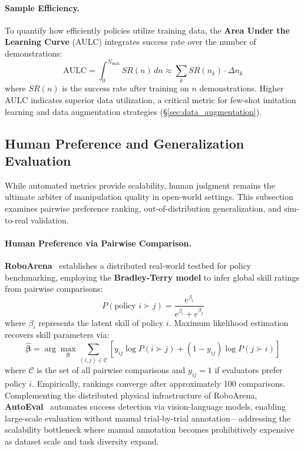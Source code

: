 \documentclass[acmsmall,screen,review,anonymous]{acmart}
\begin{document}
\paragraph{Sample Efficiency.}
To quantify how efficiently policies utilize training data, the \textbf{Area Under the Learning Curve} (AULC) integrates success rate over the number of demonstrations:
\begin{equation}
  \text{AULC} = \int_0^{N_{\max}} SR(n)\, dn \approx \sum_{k} SR(n_k) \cdot \Delta n_k
\end{equation}
where $SR(n)$ is the success rate after training on $n$ demonstrations. Higher AULC indicates superior data utilization, a critical metric for few-shot imitation learning and data augmentation strategies (\S\ref{sec:data_augmentation}).

\subsection{Human Preference and Generalization Evaluation}\label{sec:eval_human_generalization}

While automated metrics provide scalability, human judgment remains the ultimate arbiter of manipulation quality in open-world settings. This subsection examines pairwise preference ranking, out-of-distribution generalization, and sim-to-real validation.

\paragraph{Human Preference via Pairwise Comparison.}
\textbf{RoboArena}~\cite{atreya2025roboarena} establishes a distributed real-world testbed for policy benchmarking, employing the \textbf{Bradley-Terry model} to infer global skill ratings from pairwise comparisons:
\begin{equation}
  P(\text{policy } i \succ j) = \frac{e^{\beta_i}}{e^{\beta_i} + e^{\beta_j}}
\end{equation}
where $\beta_i$ represents the latent skill of policy $i$. Maximum likelihood estimation recovers skill parameters via:
\begin{equation}
  \hat{\boldsymbol{\beta}} = \arg\max_{\boldsymbol{\beta}} \sum_{(i,j)\in\mathcal{C}} \left[y_{ij}\log P(i \succ j) + (1-y_{ij})\log P(j \succ i)\right]
\end{equation}
where $\mathcal{C}$ is the set of all pairwise comparisons and $y_{ij}=1$ if evaluators prefer policy $i$. Empirically, rankings converge after approximately 100 comparisons. Complementing the distributed physical infrastructure of RoboArena, \textbf{AutoEval}~\cite{zhou2025autoeval} automates success detection via vision-language models, enabling large-scale evaluation without manual trial-by-trial annotation---addressing the scalability bottleneck where manual annotation becomes prohibitively expensive as dataset scale and task diversity expand.
\end{document}
